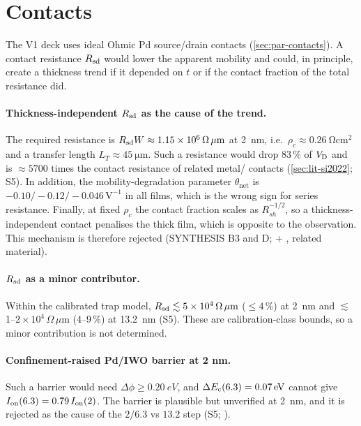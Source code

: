 \section{Contacts}\label{sec:mech-contacts}

The V1 deck uses ideal Ohmic Pd source/drain contacts (\cref{sec:par-contacts}). A contact resistance $R_{\mathrm{sd}}$ would lower the apparent mobility and could, in principle, create a thickness trend if it depended on $t$ or if the contact fraction of the total resistance did.

\paragraph{Thickness-independent $R_{\mathrm{sd}}$ as the cause of the trend.} The required resistance is $R_{\mathrm{sd}} W \approx 1.15\times10^{6}\,\Omega\,\mu\mathrm{m}$ at \SI{2}{nm}, i.e.\ $\rho_c \approx \SI{0.26}{\ohm\centi\metre\squared}$ and a transfer length $L_T \approx \SI{45}{\micro\metre}$. Such a resistance would drop 83\,\% of $V_{\mathrm{D}}$ and is $\approx 5700$ times the contact resistance of related metal/\InO{} contacts (\cref{sec:lit-si2022}; S5). In addition, the mobility-degradation parameter $\theta_{\mathrm{net}}$ is $-0.10/-0.12/-0.046\,\mathrm{V^{-1}}$ in all films, which is the wrong sign for series resistance. Finally, at fixed $\rho_c$ the contact fraction scales as $R_{sh}^{-1/2}$, so a thickness-independent contact penalises the thick film, which is opposite to the observation. This mechanism is therefore rejected (SYNTHESIS B3 and D; \evCORR{} + \evLIT, related material).

\paragraph{$R_{\mathrm{sd}}$ as a minor contributor.} Within the calibrated trap model, $R_{\mathrm{sd}} \lesssim 5\times10^{4}\,\Omega\,\mu\mathrm{m}$ ($\le4$\,\%) at \SI{2}{nm} and $\lesssim$1--$2\times10^{4}\,\Omega\,\mu\mathrm{m}$ (4--9\,\%) at \SI{13.2}{nm} (S5). These are calibration-class bounds, so a minor contribution is not determined.

\paragraph{Confinement-raised Pd/IWO barrier at 2 nm.} Such a barrier would need $\Delta\phi \ge \SI{0.20}{eV}$, and $\Delta E_{\mathrm{c}}(6.3) = \SI{0.07}{eV}$ cannot give $I_{\mathrm{on}}(6.3) = 0.79\,I_{\mathrm{on}}(2)$. The barrier is plausible but unverified at \SI{2}{nm}, and it is rejected as the cause of the $2/6.3$ vs $13.2$ step (S5; \evCORR).

